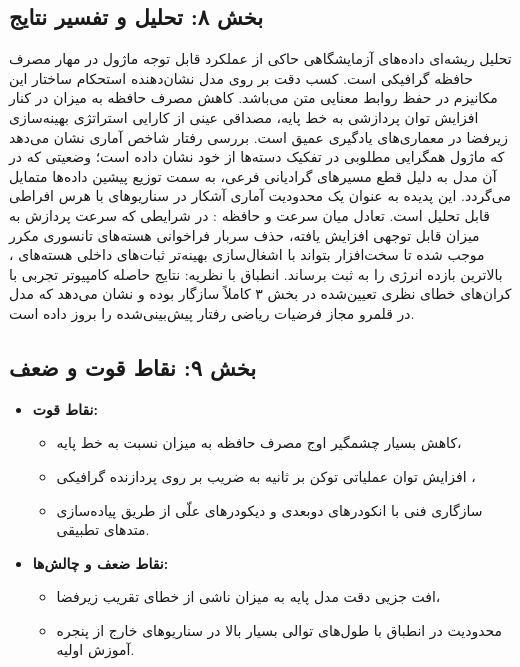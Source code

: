 \subsection*{بخش ۸: تحلیل و تفسیر نتایج }
تحلیل ریشه‌ای داده‌های آزمایشگاهی حاکی از عملکرد قابل توجه ماژول  در مهار مصرف حافظه گرافیکی است. کسب دقت  بر روی مدل  نشان‌دهنده استحکام ساختار این مکانیزم در حفظ روابط معنایی متن می‌باشد.
کاهش مصرف حافظه به میزان  در کنار افزایش توان پردازشی به  خط پایه، مصداقی عینی از کارایی استراتژی بهینه‌سازی زیرفضا در معماری‌های یادگیری عمیق است.
بررسی رفتار شاخص آماری  نشان می‌دهد که ماژول همگرایی مطلوبی در تفکیک دسته‌ها از خود نشان داده است؛ وضعیتی که در آن مدل به دلیل قطع مسیرهای گرادیانی فرعی، به سمت توزیع پیشین داده‌ها متمایل می‌گردد. این پدیده به عنوان یک محدودیت آماری آشکار در سناریوهای با هرس افراطی قابل تحلیل است.
تعادل میان سرعت و حافظه : در شرایطی که سرعت پردازش به میزان قابل توجهی افزایش یافته، حذف سربار فراخوانی هسته‌های تانسوری مکرر موجب شده تا سخت‌افزار بتواند با اشغال‌سازی بهینه‌تر ثبات‌های داخلی هسته‌های ، بالاترین بازده انرژی را به ثبت برساند.
انطباق با نظریه: نتایج حاصله کامپیوتر تجربی با کران‌های خطای نظری تعیین‌شده در بخش ۳ کاملاً سازگار بوده و نشان می‌دهد که مدل در قلمرو مجاز فرضیات ریاضی رفتار پیش‌بینی‌شده را بروز داده است.

\subsection*{بخش ۹: نقاط قوت و ضعف }
\begin{itemize}
    \item \textbf{نقاط قوت:}
    \begin{itemize}
        \item کاهش بسیار چشمگیر اوج مصرف حافظه به میزان  نسبت به خط پایه،
        \item افزایش توان عملیاتی توکن بر ثانیه به ضریب  بر روی پردازنده گرافیکی ،
        \item سازگاری فنی با انکودرهای دوبعدی و دیکودرهای علّی از طریق پیاده‌سازی متدهای تطبیقی.
    \end{itemize}
    \item \textbf{نقاط ضعف و چالش‌ها:}
    \begin{itemize}
        \item افت جزیی دقت مدل پایه به میزان  ناشی از خطای تقریب زیرفضا،
        \item محدودیت در انطباق با طول‌های توالی بسیار بالا در سناریوهای خارج از پنجره آموزش اولیه.
    \end{itemize}
\end{itemize}

